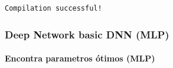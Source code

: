 \documentclass[11pt]{article}
\begin{document}
    \begin{Verbatim}[commandchars=\\\{\}]
Compilation successful!
    \end{Verbatim}

    \hypertarget{deep-network-basic-dnn-mlp}{%
\subsubsection{Deep Network basic DNN
(MLP)}\label{deep-network-basic-dnn-mlp}}

    \hypertarget{encontra-parametros-uxf3timos-mlp}{%
\paragraph{Encontra parametros ótimos
(MLP)}\label{encontra-parametros-uxf3timos-mlp}}
\end{document}
